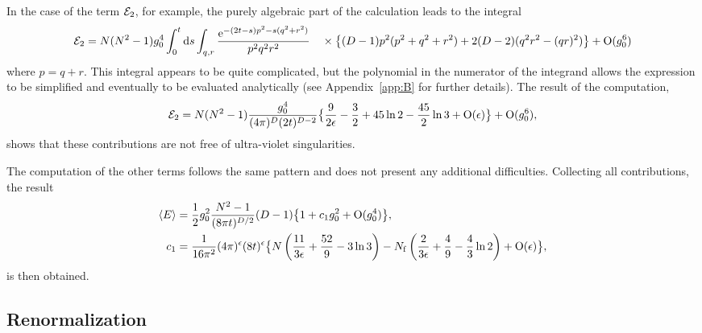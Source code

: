 In the case of the term ${\cal E}_2$, for example,
the purely algebraic part of the calculation leads to
the integral
\begin{equation}
   {\cal E}_2=N(N^2-1)g_0^4\int_0^t\mathrm{d} s\int_{q,r}
   {\mathrm{e}^{-(2t-s)p^2-s(q^2+r^2)}\over p^2q^2r^2}
   \nonumber\\
   \quad\times\bigl\{
   (D-1)p^2(p^2+q^2+r^2)+2(D-2)(q^2r^2-(qr)^2)\bigr\}
   +\mathrm{O}(g_0^6)
   \label{eq:E2int}
\end{equation}
where $p=q+r$. This integral appears to be quite complicated, but
the polynomial in the numerator of the integrand allows the
expression to be simplified and eventually to be evaluated
analytically (see Appendix~\ref{app:B} for further details).
The result of the computation,
\begin{equation}
   {\cal E}_2=N(N^2-1){g_0^4\over(4\pi)^D(2t)^{D-2}}
   \bigl\{\frac{9}{2\epsilon}-\frac{3}{2}+45\ln2-\frac{45}{2}\ln3+
   \mathrm{O}(\epsilon)\bigr\}+\mathrm{O}(g_0^6),
   \label{eq:E2res}
\end{equation}
shows that these contributions are not free of ultra-violet
singularities.

The computation of the other terms
follows the same pattern and does not
present any additional difficulties.
Collecting all contributions, the result
\begin{align}
  \langle E\rangle&=\frac{1}{2}g_0^2{N^2-1\over(8\pi t)^{D/2}}(D-1)
  \bigl\{1+c_1g_0^2+\mathrm{O}(g_0^4)
  \bigr\},
  \label{eq:Epert}\\
  c_1&={1\over16\pi^2}(4\pi)^{\epsilon}(8t)^{\epsilon}\bigl\{
  N\left(\frac{11}{3\epsilon}+\frac{52}{9}-3\ln3\right)
  -N_{\mathrm{f}}\left(\frac{2}{3\epsilon}+\frac{4}{9}-\frac{4}{3}\ln2\right)
  +\mathrm{O}(\epsilon)\bigr\},
\end{align}
is then obtained.


\subsection{Renormalization}

